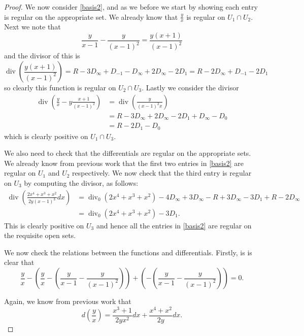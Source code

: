 \documentclass[draft, 11pt]{article} %
\theoremstyle{plain}
\theoremstyle{remark}
\DeclareMathOperator{\di}{div}
\begin{document}
\begin{proof}
We now consider \eqref{basis2}, and as we before we start by showing each entry is regular on the appropriate set.
We already know that $\frac{y}{x}$ is regular on $U_1 \cap U_2$.
Next we note that
\[
\frac{y}{x-1} - \frac{y}{(x-1)^2} = \frac{y(x+1)}{(x-1)^2}
\]
and the divisor of this is
\[
\di\left( \frac{y(x+1)}{(x-1)^2} \right)  = R - 3D_\infty + D_{-1} - D_\infty + 2D_\infty - 2D_1 = R - 2D_\infty + D_{-1} - 2D_1
\]
so clearly this function is regular on $U_2 \cap U_3$.
Lastly we consider the divisor
\begin{align}
\di\left( \frac{y}{x} - y\frac{x+1}{(x-1)^2} \right) & = \di \left( \frac{y}{(x-1)^2x} \right) \\
& = R - 3D_\infty + 2D_\infty - 2D_1 + D_\infty - D_0 \\
& = R -2D_1 -D_0
\end{align}
which is clearly positive on $U_1 \cap U_3$.

We also need to check that the differentials are regular on the appropriate sets.
We already know from previous work that the first two entries in \eqref{basis2} are regular on $U_1$ and $U_2$ respectively.
We now check that the third entry is regular on $U_3$ by computing the divisor, as follows:
\begin{align}
\di\left( \frac{2x^4+x^3+x^2}{2y(x-1)^3}dx \right) & = \di_0(2x^4+x^3+x^2) - 4D_\infty+ 3D_\infty - R + 3D_\infty - 3D_1 +R - 2D_\infty \\
& = \di_0(2x^4 + x^3 + x^2) - 3D_1.
\end{align}
This is clearly positive on $U_3$ and hence all the entries in \eqref{basis2} are regular on the requisite open sets.

We now check the relations between the functions and differentials.
Firstly, is is clear that
\[
\frac{y}{x} - \left( \frac{y}{x} - \left( \frac{y}{x-1} - \frac{y}{(x-1)^2} \right) \right) +  \left( - \left( \frac{y}{x-1} - \frac{y}{(x-1)^2} \right) \right)  = 0.
\]

Again, we know from previous work that
\[
d \left( \frac{y}{x} \right) = \frac{x^3+1}{2yx^2}dx + \frac{x^4 + x^2}{2y}dx.
\]


\end{proof}
\end{document}
